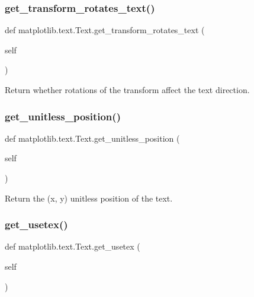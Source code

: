 \subsubsection{\texorpdfstring{get\+\_\+transform\+\_\+rotates\+\_\+text()}{get\_transform\_rotates\_text()}}
{\footnotesize\ttfamily def matplotlib.\+text.\+Text.\+get\+\_\+transform\+\_\+rotates\+\_\+text (\begin{DoxyParamCaption}\item[{}]{self }\end{DoxyParamCaption})}

\begin{DoxyVerb}Return whether rotations of the transform affect the text direction.
\end{DoxyVerb}
 \mbox{\label{classmatplotlib_1_1text_1_1Text_ad406795ef1333c7c7ec0a2cb7d3dfda6}} 
\subsubsection{\texorpdfstring{get\+\_\+unitless\+\_\+position()}{get\_unitless\_position()}}
{\footnotesize\ttfamily def matplotlib.\+text.\+Text.\+get\+\_\+unitless\+\_\+position (\begin{DoxyParamCaption}\item[{}]{self }\end{DoxyParamCaption})}

\begin{DoxyVerb}Return the (x, y) unitless position of the text.\end{DoxyVerb}
 \mbox{\label{classmatplotlib_1_1text_1_1Text_a0aa4725d153f5ceb705e1762f27b784e}} 
\subsubsection{\texorpdfstring{get\+\_\+usetex()}{get\_usetex()}}
{\footnotesize\ttfamily def matplotlib.\+text.\+Text.\+get\+\_\+usetex (\begin{DoxyParamCaption}\item[{}]{self }\end{DoxyParamCaption})}

